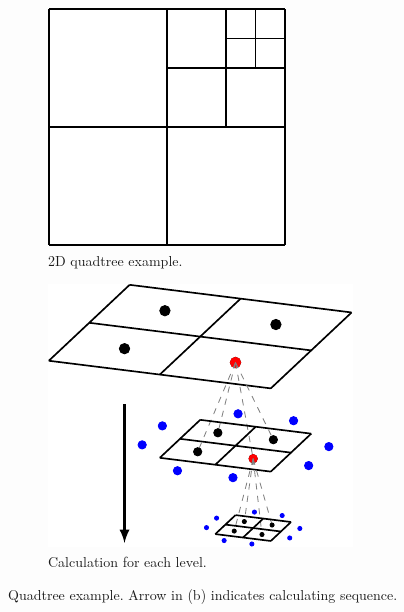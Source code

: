 \begin{figure}[h]
  \begin{subfigure}[b]{0.5\textwidth}
    \centering 
    \includegraphics{./image/poisson-h/2dquad}
    \caption{2D quadtree example.}
    \label{fig:poisson-2dquad}
  \end{subfigure}
  \begin{subfigure}[b]{0.5\textwidth}
    \centering 
    \includegraphics{./image/poisson-h/caculation}
    \caption{Calculation for each level.}
    \label{fig:poisson-caculation}
  \end{subfigure}
    \caption{Quadtree example. Arrow in (b) indicates calculating sequence.}
    \label{fig:poisson-2dexample}
\end{figure}
